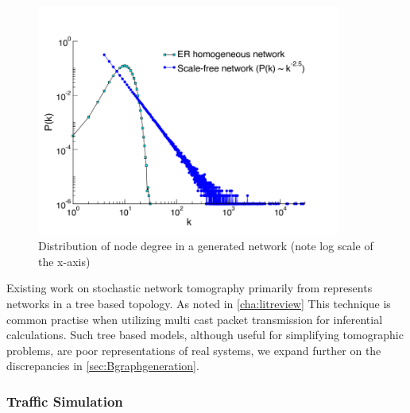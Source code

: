 \begin{figure}[t]
    \centering
    \includegraphics[width=10cm]{figs/intro/nodedegree-dist.png}
    \caption[Distribution of node degree in a generated network]{Distribution of node degree in a generated network (note log scale of the x-axis) \cite{baronchelli_networks_2013}}
    \label{fig:nddist}
\end{figure}
Existing work on stochastic network tomography primarily from \cite{thoppe_stochastic_2014} \cite{kolar_distributed_2020} represents networks in a tree based topology. As noted in \cref{cha:litreview} This technique is common practise when utilizing multi cast packet transmission for inferential calculations. Such tree based models, although useful for simplifying tomographic problems, are poor representations of real systems, we expand further on the discrepancies in \cref{sec:Bgraphgeneration}.

\subsubsection*{Traffic Simulation}
\label{sssec:Itrafficsimulation}

